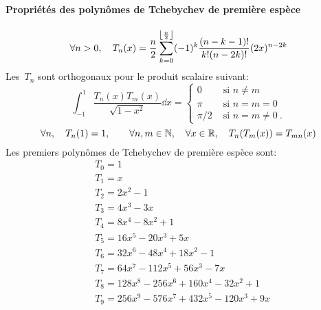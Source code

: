 \paragraph{Propriétés des polynômes de Tchebychev de première espèce} 
\begin{equation}
\forall n>0, \quad T_n(x)=\dfrac n2\displaystyle\sum_{k=0}^{\left\lfloor \frac n2\right\rfloor}(-1)^k \frac{(n-k-1)!}{k!(n-2k)!}(2x)^{n-2k} 
\end{equation}
Les~$T_n$ sont orthogonaux pour le produit scalaire suivant: 
\begin{equation}
 \int_{-1}^1 \frac{T_n(x)T_m(x)}{\sqrt{1-x^2}}\dd x= 
\begin{cases} 0&\text{ si } n\ne m\\ \pi&\text{ si } n=m=0\\ \pi/2&\text{ si } n=m\ne 0~. 
\end{cases} 
\end{equation}
\begin{equation}
\forall n, \quad T_n(1)=1,\qquad\forall n,m\in\mathbb N,\quad \forall x\in\mathbb R, \quad T_n(T_m(x))=T_{mn}(x) 
\end{equation}
Les premiers polynômes de Tchebychev de première espèce sont:
\begin{equation}
\begin{aligned}
&T_0 = 1 \\
&T_1 = x \\
&T_2 = 2x^2 - 1 \\
&T_3 = 4x^3 - 3x \\
& T_4 = 8x^4 - 8x^2 + 1 \\
& T_5 = 16x^5 - 20x^3 + 5x \\
& T_6 = 32x^6 - 48x^4 + 18x^2 - 1 \\
& T_7 = 64x^7 - 112x^5 + 56x^3 - 7x \\
& T_8 = 128x^8 - 256x^6 + 160x^4 - 32x^2 + 1 \\
&T_9 = 256x^9 - 576x^7 + 432x^5 - 120x^3 + 9x
\end{aligned}
\end{equation}
